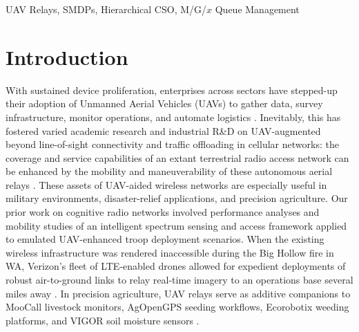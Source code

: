 \documentclass[12pt, draftcls, onecolumn]{IEEEtran}
\theoremstyle{plain}
\theoremstyle{definition}
\theoremstyle{remark}
\begin{document}
\begin{IEEEkeywords}
UAV Relays, SMDPs, Hierarchical CSO, M/G/$x$ Queue Management
\end{IEEEkeywords}
\vspace{-4mm}


\section{Introduction}\label{S1}
\vspace{-2mm}

With sustained device proliferation, enterprises across sectors have stepped-up their adoption of Unmanned Aerial Vehicles (UAVs) to gather data, survey infrastructure, monitor operations, and automate logistics \cite{UAVSurvey, UAVTutorial}. Inevitably, this has fostered varied academic research and industrial R\&D on UAV-augmented beyond line-of-sight connectivity and traffic offloading in cellular networks: the coverage and service capabilities of an extant terrestrial radio access network can be enhanced by the mobility and maneuverability of these autonomous aerial relays \cite{LOSDominance, FundamentalTradeoffs}. These assets of UAV-aided wireless networks are especially useful in military environments, disaster-relief applications, and precision agriculture. Our prior work on cognitive radio networks \cite{TCCN} involved performance analyses and mobility studies of an intelligent spectrum sensing and access framework applied to emulated UAV-enhanced troop deployment scenarios. When the existing wireless infrastructure was rendered inaccessible during the Big Hollow fire in WA, Verizon's fleet of LTE-enabled drones allowed for expedient deployments of robust air-to-ground links to relay real-time imagery to an operations base several miles away \cite{VerizonDisasterRelief}. In precision agriculture, UAV relays serve as additive companions to MooCall livestock monitors, AgOpenGPS seeding workflows, Ecorobotix weeding platforms, and VIGOR soil moisture sensors \cite{VerizonAgriculture}.
\end{document}

